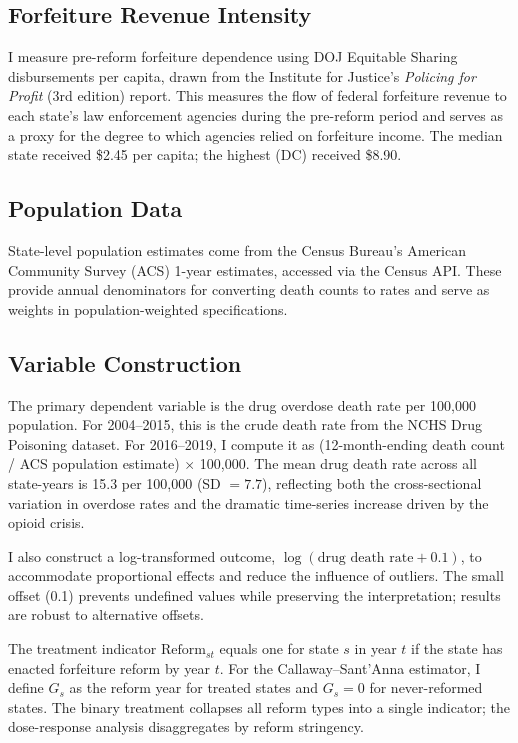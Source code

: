 \documentclass[12pt]{article}
\begin{document}
\subsection{Forfeiture Revenue Intensity}

I measure pre-reform forfeiture dependence using DOJ Equitable Sharing disbursements per capita, drawn from the Institute for Justice's \textit{Policing for Profit} (3rd edition) report. This measures the flow of federal forfeiture revenue to each state's law enforcement agencies during the pre-reform period and serves as a proxy for the degree to which agencies relied on forfeiture income. The median state received \$2.45 per capita; the highest (DC) received \$8.90.

\subsection{Population Data}

State-level population estimates come from the Census Bureau's American Community Survey (ACS) 1-year estimates, accessed via the Census API. These provide annual denominators for converting death counts to rates and serve as weights in population-weighted specifications.

\subsection{Variable Construction}

The primary dependent variable is the drug overdose death rate per 100,000 population. For 2004--2015, this is the crude death rate from the NCHS Drug Poisoning dataset. For 2016--2019, I compute it as (12-month-ending death count / ACS population estimate) $\times$ 100,000. The mean drug death rate across all state-years is 15.3 per 100,000 (SD $= 7.7$), reflecting both the cross-sectional variation in overdose rates and the dramatic time-series increase driven by the opioid crisis.

I also construct a log-transformed outcome, $\log(\text{drug death rate} + 0.1)$, to accommodate proportional effects and reduce the influence of outliers. The small offset (0.1) prevents undefined values while preserving the interpretation; results are robust to alternative offsets.

The treatment indicator $\text{Reform}_{st}$ equals one for state $s$ in year $t$ if the state has enacted forfeiture reform by year $t$. For the Callaway--Sant'Anna estimator, I define $G_s$ as the reform year for treated states and $G_s = 0$ for never-reformed states. The binary treatment collapses all reform types into a single indicator; the dose-response analysis disaggregates by reform stringency.
\end{document}
